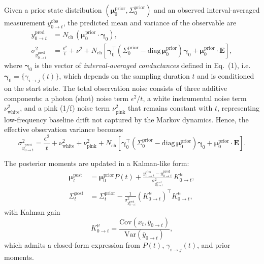 \documentclass[9pt]{elife}
\begin{document}
Given a prior state distribution $(\bm{\mu}^{\mathrm{prior}}_0,\Sigma^{\mathrm{prior}}_0)$ and an observed interval-averaged measurement $y^{\mathrm{obs}}_{0\to t}$, the predicted mean and variance of the observable are
\begin{align}
	y^{\mathrm{pred}}_{0\to t} &= N_{\mathrm{ch}}\,(\bm{\mu}^{\mathrm{prior}}_0\!\cdot\!\bm{\gamma}_0),\\[3pt]
	\sigma^2_{y^{\mathrm{pred}}_{0\to t}} &= 
	\frac{\epsilon^2}{t} + \nu^2 
	+ N_{\mathrm{ch}}\!\left[\bm{\gamma}_0^\top(\Sigma^{\mathrm{prior}}_0-\mathrm{diag}\,\bm{\mu}^{\mathrm{prior}}_0)\bm{\gamma}_0 
	+ \bm{\mu}^{\mathrm{prior}}_0\!\cdot\!\mathbf{E}\right],
\end{align}
where $\bm{\gamma}_0$ is the vector of \emph{interval-averaged conductances} defined in Eq.~(1), i.e. $\bm{\gamma}_0=\{\gamma_{i\to j}(t)\}$, which depends on the sampling duration $t$ and is conditioned on the start state.  
The total observation noise consists of three additive components:
a photon (shot) noise term $\epsilon^2/t$,
a white instrumental noise term $\nu^2_{\mathrm{white}}$, 
and a pink (1/f) noise term $\nu^2_{\mathrm{pink}}$ that remains constant with $t$, representing low-frequency baseline drift not captured by the Markov dynamics. 
Hence, the effective observation variance becomes
\[
\sigma^2_{y^{\mathrm{pred}}_{0\to t}} = 
\frac{\epsilon^2}{t} + \nu^2_{\mathrm{white}} + \nu^2_{\mathrm{pink}}
+ N_{\mathrm{ch}}\!\left[\bm{\gamma}_0^\top(\Sigma^{\mathrm{prior}}_0-\mathrm{diag}\,\bm{\mu}^{\mathrm{prior}}_0)\bm{\gamma}_0 
+ \bm{\mu}^{\mathrm{prior}}_0\!\cdot\!\mathbf{E}\right].
\]


The posterior moments are updated in a Kalman-like form:
\begin{align}
	\bm{\mu}^{\mathrm{post}}_{t} &=
	\bm{\mu}^{\mathrm{prior}}_0 P(t)
	+ \frac{y^{\mathrm{obs}}_{0\to t}-y^{\mathrm{pred}}_{0\to t}}{\sigma^2_{y^{\mathrm{pred}}_{0\to t}}}\,K^\mu_{0\to t},\\[3pt]
	\Sigma^{\mathrm{post}}_{t} &=
	\Sigma^{\mathrm{prior}}_{t}
	- \frac{1}{\sigma^2_{y^{\mathrm{pred}}_{0\to t}}}
	(K^\mu_{0\to t})^\top K^\mu_{0\to t},
\end{align}
with Kalman gain
\[
K^\mu_{0\to t} = \frac{\mathrm{Cov}(x_t,\bar y_{0\to t})}{\mathrm{Var}(\bar y_{0\to t})},
\]
which admits a closed-form expression from $P(t)$, $\gamma_{i\to j}(t)$, and prior moments.

\end{document}
